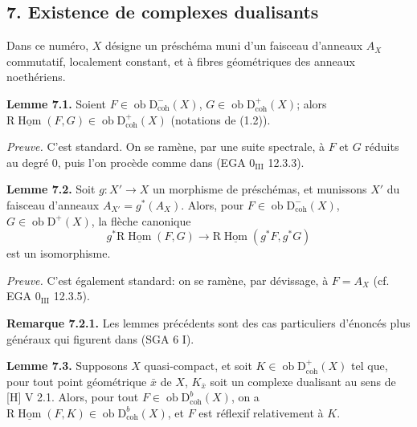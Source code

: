 \documentclass[11pt]{article}
\DeclareMathOperator{\Hom}{Hom}
\newcommand{\R}{\mathrm{R}}\newcommand{\RHomCore}{\mathrm{RHom}}
\newcommand{\D}{\mathrm{D}}
\newcommand{\ob}{\operatorname{ob}}
\providecommand{\Hom}{\operatorname{Hom}}
\providecommand{\ob}{\operatorname{ob}}
\providecommand{\R}{\mathrm R}
\providecommand{\Hom}{\operatorname{Hom}}
\begin{document}
\subsection*{7. Existence de complexes dualisants}

Dans ce numéro, $X$ désigne un préschéma muni d'un faisceau d'anneaux $A_X$ commutatif, localement constant, et à fibres géométriques des anneaux noethériens.

\textbf{Lemme 7.1.} Soient $F\in\ob\D^{-}_{\mathrm{coh}}(X)$, $G\in\ob\D^{+}_{\mathrm{coh}}(X)$; alors $\R\underline{\Hom}(F,G)\in\ob\D^{+}_{\mathrm{coh}}(X)$ (notations de (1.2)).

\emph{Preuve.} C'est standard. On se ramène, par une suite spectrale, à $F$ et $G$ réduits au degré $0$, puis l'on procède comme dans (EGA $0_{\mathrm{III}}$ 12.3.3).

\textbf{Lemme 7.2.} Soit $g:X'\to X$ un morphisme de préschémas, et munissons $X'$ du faisceau d'anneaux $A_{X'}=g^*(A_X)$. Alors, pour $F\in\ob\D^{-}_{\mathrm{coh}}(X)$, $G\in\ob\D^{+}(X)$, la flèche canonique
\[
        g^*\R\underline{\Hom}(F,G)\longrightarrow \R\underline{\Hom}(g^*F,g^*G)
\]
est un isomorphisme.

\emph{Preuve.} C'est également standard: on se ramène, par dévissage, à $F=A_X$ (cf. EGA $0_{\mathrm{III}}$ 12.3.5).

\textbf{Remarque 7.2.1.} Les lemmes précédents sont des cas particuliers d'énoncés plus généraux qui figurent dans (SGA 6 I).

\textbf{Lemme 7.3.} Supposons $X$ quasi-compact, et soit $K\in\ob\D^{+}_{\mathrm{coh}}(X)$ tel que, pour tout point géométrique $\bar{x}$ de $X$, $K_{\bar{x}}$ soit un complexe dualisant au sens de [H] V 2.1. Alors, pour tout $F\in\ob\D^{b}_{\mathrm{coh}}(X)$, on a $\R\underline{\Hom}(F,K)\in\ob\D^{b}_{\mathrm{coh}}(X)$, et $F$ est réflexif relativement à $K$.
\end{document}
